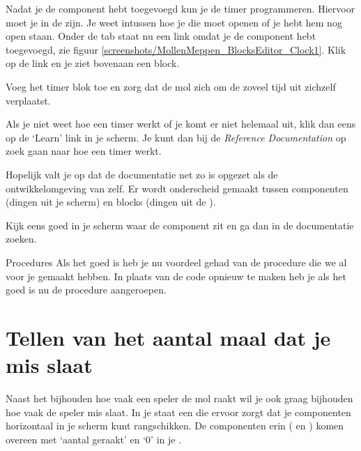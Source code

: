 Nadat je de  component hebt toegevoegd kun je de timer programmeren. Hiervoor moet je in de  zijn. Je weet intussen hoe je die moet openen of je hebt hem nog open staan. 
Onder de  tab staat nu een  link omdat je de  component hebt toegevoegd, zie figuur \ref{screenshots/MollenMeppen_BlocksEditor_Clock1}. Klik op de link en je ziet bovenaan een  block.

 
\begin{opgave}
    \opgVraag
	Voeg het timer blok toe en zorg dat de mol zich om de zoveel tijd uit zichzelf verplaatst.
\end{opgave}

Als je niet weet hoe een timer werkt of je komt er niet helemaal uit, klik dan eens op de `Learn' link in je  scherm. Je kunt dan bij de \emph{Reference Documentation} op zoek gaan naar hoe een timer werkt.

Hopelijk valt je op dat de documentatie net zo is opgezet als de ontwikkelomgeving van \ai zelf. Er wordt onderscheid gemaakt tussen componenten (dingen uit je  scherm) en blocks (dingen uit de ).

Kijk eens goed in je  scherm waar de  component zit en ga dan in de documentatie zoeken.

\begin{derivation}{Procedures}
Als het goed is heb je nu voordeel gehad van de procedure die we al voor je gemaakt hebben. In plaats van de code opnieuw te maken heb je als het goed is nu de procedure aangeroepen.
\end{derivation}


\section{Tellen van het aantal maal dat je mis slaat}
Naast het bijhouden hoe vaak een speler de mol raakt wil je ook graag bijhouden hoe vaak de speler mis slaat. In je  staat een  die ervoor zorgt dat je componenten horizontaal in je scherm kunt rangschikken. De componenten erin ( en ) komen overeen met `aantal geraakt' en `0' in je .

